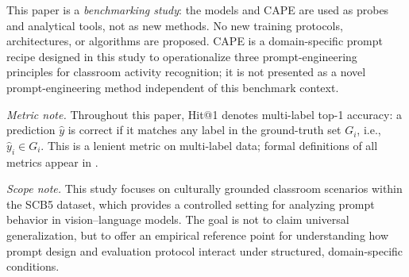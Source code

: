 \documentclass[electronics,article,submit,pdftex,moreauthors]{Definitions/mdpi}
\begin{document}
\noindent This paper is a \emph{benchmarking study}: the models and CAPE are used as probes and analytical tools, not as new methods. No new training protocols, architectures, or algorithms are proposed. CAPE is a domain-specific prompt recipe designed in this study to operationalize three prompt-engineering principles for classroom activity recognition; it is not presented as a novel prompt-engineering method independent of this benchmark context.

\noindent\textit{Metric note.} Throughout this paper, Hit@1 denotes multi-label top-1 accuracy: a prediction $\hat{y}$ is correct if it matches any label in the ground-truth set $G_i$, i.e., $\hat{y}_i \in G_i$. This is a lenient metric on multi-label data; formal definitions of all metrics appear in .

\noindent\textit{Scope note.} This study focuses on culturally grounded classroom scenarios within the SCB5 dataset, which provides a controlled setting for analyzing prompt behavior in vision--language models. The goal is not to claim universal generalization, but to offer an empirical reference point for understanding how prompt design and evaluation protocol interact under structured, domain-specific conditions.
\end{document}
